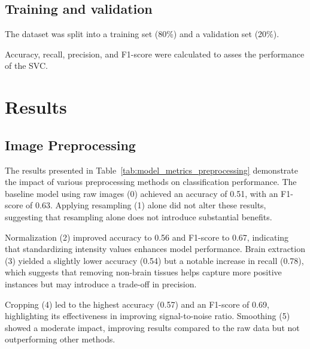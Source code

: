 %
\subsection{Training and validation}

The dataset was split into a training set (80\%) and a validation set (20\%). 

Accuracy, recall, precision, and F1-score were calculated to asses the performance of the SVC.

\section{Results}

\subsection{Image Preprocessing}

The results presented in Table~\ref{tab:model_metrics_preprocessing} demonstrate the impact of various preprocessing methods on classification performance. The baseline model using raw images (0) achieved an accuracy of 0.51, with an F1-score of 0.63. Applying resampling (1) alone did not alter these results, suggesting that resampling alone does not introduce substantial benefits.

Normalization (2) improved accuracy to 0.56 and F1-score to 0.67, indicating that standardizing intensity values enhances model performance. Brain extraction (3) yielded a slightly lower accuracy (0.54) but a notable increase in recall (0.78), which suggests that removing non-brain tissues helps capture more positive instances but may introduce a trade-off in precision.

Cropping (4) led to the highest accuracy (0.57) and an F1-score of 0.69, highlighting its effectiveness in improving signal-to-noise ratio. Smoothing (5) showed a moderate impact, improving results compared to the raw data but not outperforming other methods.

